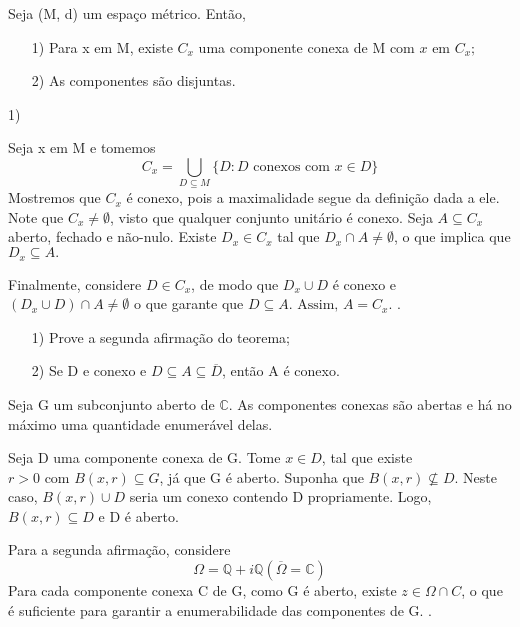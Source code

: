 \documentclass[ComplexAnalysis/complex.tex]{subfiles}
\begin{document}
\begin{theorem*}
	Seja (M, d) um espaço métrico. Então,
	\begin{itemize}
		\item[1)] Para x em M, existe $C _{x}$ uma componente conexa de M com $x\text{ em }C _{x}; $
		\item[2)] As componentes são disjuntas.
	\end{itemize}
\end{theorem*}
\begin{proof*}
	1) \par Seja x em M e tomemos
	$$
		C _{x} = \bigcup _{D\subseteq{M}} \{D: D \text{ conexos com } x\in{D}\}
	$$
	Mostremos que $C _{x}$ é conexo, pois a maximalidade segue da definição dada a ele. Note que $C _{x}\neq\emptyset$, visto que
	qualquer conjunto unitário é conexo. Seja $A\subseteq{C _{x}}$ aberto, fechado e não-nulo. Existe $D _{x}\in C _{x}$ tal
	que $D _{x}\cap{A}\neq\emptyset$, o que implica que $D _{x}\subseteq{A}.$

	Finalmente, considere $D\in C _{x}$, de modo que $D _{x}\cup{D}$ é conexo e $(D _{x}\cup{D})\cap{A}\neq\emptyset$ o que garante
	que $D\subseteq{A}. \text{ Assim, } A = C _{x}.$
	\qedsymbol.
\end{proof*}
\begin{exer*}
	\begin{itemize}
		\item[1)] Prove a segunda afirmação do teorema;
		\item[2)] Se D e conexo e $D\subseteq{A}\subseteq{\overline{D}}$, então A é conexo.
	\end{itemize}
\end{exer*}

\begin{theorem*}
	Seja G um subconjunto aberto de $\mathbb{C}.$ As componentes conexas são abertas e há no máximo uma quantidade enumerável
	delas.
\end{theorem*}
\begin{proof*}
	Seja D uma componente conexa de G. Tome $x\in{D}$, tal que existe $r > 0 \text{ com } B(x, r)\subseteq{G}$, já que G é aberto.
	Suponha que $B(x, r)\not\subseteq{D}.$ Neste caso, $B(x, r)\cup{D}$ seria um conexo contendo D propriamente. Logo,
	$B(x, r)\subseteq{D}$ e D é aberto.

	Para a segunda afirmação, considere
	$$
		\Omega = \mathbb{Q} + i\mathbb{Q} (\overline{\Omega} = \mathbb{C})
	$$
	Para cada componente conexa C de G, como G é aberto, existe $z\in{\Omega\cap{C}}$, o que é suficiente para garantir a enumerabilidade
	das componentes de G.
	\qedsymbol.
\end{proof*}
\end{document}
